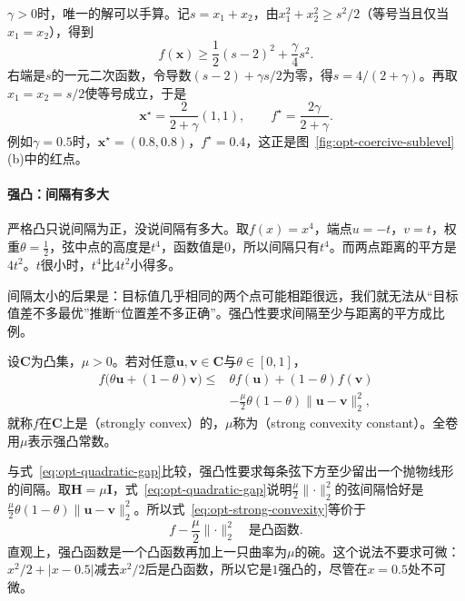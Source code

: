 $\gamma>0$时，唯一的解可以手算。记$s=x_1+x_2$，由$x_1^2+x_2^2\geq s^2/2$（等号当且仅当$x_1=x_2$），得到
\[
 f(\bm{x})\geq\frac12(s-2)^2+\frac{\gamma}{4}s^2.
\]
右端是$s$的一元二次函数，令导数$(s-2)+\gamma s/2$为零，得$s=4/(2+\gamma)$。再取$x_1=x_2=s/2$使等号成立，于是
\begin{equation}
 \bm{x}^\star=\frac{2}{2+\gamma}(1,1),\qquad f^\star=\frac{2\gamma}{2+\gamma}.
 \label{eq:opt-ridge-solution}
\end{equation}
例如$\gamma=0.5$时，$\bm{x}^\star=(0.8,0.8)$，$f^\star=0.4$，这正是图~\ref{fig:opt-coercive-sublevel}(b)中的红点。

\paragraph{强凸：间隔有多大}
严格凸只说间隔为正，没说间隔有多大。取$f(x)=x^4$，端点$u=-t$，$v=t$，权重$\theta=\frac12$，弦中点的高度是$t^4$，函数值是$0$，所以间隔只有$t^4$。而两点距离的平方是$4t^2$。$t$很小时，$t^4$比$4t^2$小得多。

间隔太小的后果是：目标值几乎相同的两个点可能相距很远，我们就无法从“目标值差不多最优”推断“位置差不多正确”。强凸性要求间隔至少与距离的平方成比例。

\begin{definition}[强凸函数]
\label{def:opt-strong-convex}
设$\bm{C}$为凸集，$\mu>0$。若对任意$\bm{u},\bm{v}\in\bm{C}$与$\theta\in[0,1]$，
\begin{equation}
 \begin{aligned}
 f\bigl(\theta\bm{u}+(1-\theta)\bm{v}\bigr)\leq{}&\theta f(\bm{u})+(1-\theta)f(\bm{v})\\
 &-\frac{\mu}{2}\theta(1-\theta)\lVert\bm{u}-\bm{v}\rVert_2^2,
 \end{aligned}
 \label{eq:opt-strong-convexity}
\end{equation}
就称$f$在$\bm{C}$上是（strongly convex）的，$\mu$称为（strong convexity constant）。全卷用$\mu$表示强凸常数。
\end{definition}

与式~\eqref{eq:opt-quadratic-gap}比较，强凸性要求每条弦下方至少留出一个抛物线形的间隔。取$\bm{H}=\mu\bm{I}$，式~\eqref{eq:opt-quadratic-gap}说明$\frac{\mu}{2}\lVert\cdot\rVert_2^2$的弦间隔恰好是$\frac{\mu}{2}\theta(1-\theta)\lVert\bm{u}-\bm{v}\rVert_2^2$。所以式~\eqref{eq:opt-strong-convexity}等价于
\begin{equation}
 f-\frac{\mu}{2}\lVert\cdot\rVert_2^2\quad\text{是凸函数}.
 \label{eq:opt-strong-equivalent}
\end{equation}
直观上，强凸函数是一个凸函数再加上一只曲率为$\mu$的碗。这个说法不要求可微：$x^2/2+\lvert x-0.5\rvert$减去$x^2/2$后是凸函数，所以它是$1$强凸的，尽管在$x=0.5$处不可微。

